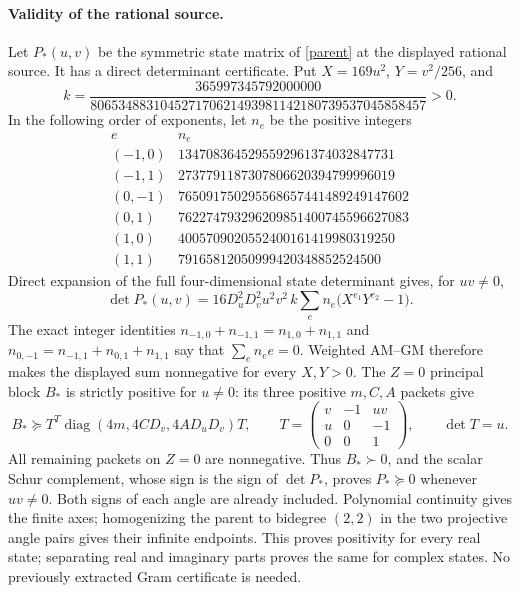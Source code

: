 \paragraph{Validity of the rational source.}
Let $P_*(u,v)$ be the symmetric state matrix of \eqref{parent} at
the displayed rational source. It has a direct determinant certificate. Put
$X=169u^2$, $Y=v^2/256$, and
\[
 k=\frac{365997345792000000}
 {806534883104527170621493981142180739537045858457}>0.
\]
In the following order of exponents, let $n_e$ be the positive integers
\[
\begin{array}{c|r}
 e&n_e\\\hline
 (-1,0)&1347083645295592961374032847731\\
 (-1,1)&2737791187307806620394799996019\\
 (0,-1)&765091750295568657441489249147602\\
 (0,1)&762274793296209851400745596627083\\
 (1,0)&4005709020552400161419980319250\\
 (1,1)&79165812050999420348852524500
\end{array}
\]
Direct expansion of the full four-dimensional state determinant gives,
for $uv\ne0$,
\[
 \det P_*(u,v)=16D_u^2D_v^2u^2v^2\,k
       \sum_e n_e\bigl(X^{e_1}Y^{e_2}-1\bigr).
\]
The exact integer identities
$n_{-1,0}+n_{-1,1}=n_{1,0}+n_{1,1}$ and
$n_{0,-1}=n_{-1,1}+n_{0,1}+n_{1,1}$ say that
$\sum_e n_e e=0$. Weighted AM--GM therefore makes the displayed
sum nonnegative for every $X,Y>0$. The $Z=0$ principal block $B_*$
is strictly positive for $u\ne0$: its three positive $m,C,A$ packets give
\[
 B_*\succeq T^T\operatorname{diag}(4m,4CD_v,4AD_uD_v)T,
 \qquad
 T=\begin{pmatrix}v&-1&uv\\u&0&-1\\0&0&1\end{pmatrix},
 \qquad \det T=u.
\]
All remaining packets on $Z=0$ are nonnegative. Thus $B_*\succ0$,
and the scalar Schur complement, whose sign is the sign of
$\det P_*$, proves $P_*\succeq0$ whenever $uv\ne0$.
Both signs of each angle are already included. Polynomial continuity
gives the finite axes; homogenizing the parent to bidegree $(2,2)$
in the two projective angle pairs gives their infinite endpoints.
This proves positivity for every real state; separating real and
imaginary parts proves the same for complex states.
No previously extracted Gram certificate is needed.
